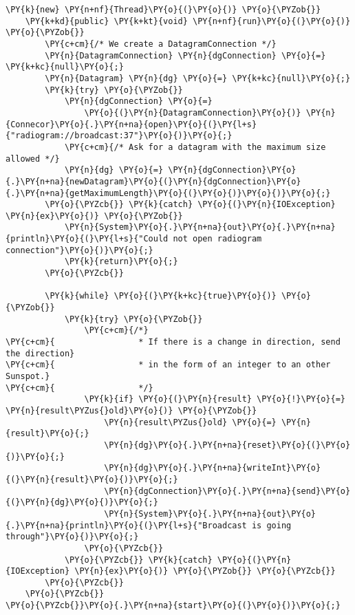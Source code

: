 \begin{Verbatim}[commandchars=\\\{\}]
\PY{k}{new} \PY{n+nf}{Thread}\PY{o}{(}\PY{o}{)} \PY{o}{\PYZob{}}
    \PY{k+kd}{public} \PY{k+kt}{void} \PY{n+nf}{run}\PY{o}{(}\PY{o}{)} \PY{o}{\PYZob{}}
        \PY{c+cm}{/* We create a DatagramConnection */}
        \PY{n}{DatagramConnection} \PY{n}{dgConnection} \PY{o}{=} \PY{k+kc}{null}\PY{o}{;}
        \PY{n}{Datagram} \PY{n}{dg} \PY{o}{=} \PY{k+kc}{null}\PY{o}{;}
        \PY{k}{try} \PY{o}{\PYZob{}}
            \PY{n}{dgConnection} \PY{o}{=}
                \PY{o}{(}\PY{n}{DatagramConnection}\PY{o}{)} \PY{n}{Connecor}\PY{o}{.}\PY{n+na}{open}\PY{o}{(}\PY{l+s}{"radiogram://broadcast:37"}\PY{o}{)}\PY{o}{;}
            \PY{c+cm}{/* Ask for a datagram with the maximum size allowed */}
            \PY{n}{dg} \PY{o}{=} \PY{n}{dgConnection}\PY{o}{.}\PY{n+na}{newDatagram}\PY{o}{(}\PY{n}{dgConnection}\PY{o}{.}\PY{n+na}{getMaximumLength}\PY{o}{(}\PY{o}{)}\PY{o}{)}\PY{o}{;}
        \PY{o}{\PYZcb{}} \PY{k}{catch} \PY{o}{(}\PY{n}{IOException} \PY{n}{ex}\PY{o}{)} \PY{o}{\PYZob{}}
            \PY{n}{System}\PY{o}{.}\PY{n+na}{out}\PY{o}{.}\PY{n+na}{println}\PY{o}{(}\PY{l+s}{"Could not open radiogram connection"}\PY{o}{)}\PY{o}{;}
            \PY{k}{return}\PY{o}{;}
        \PY{o}{\PYZcb{}}

        \PY{k}{while} \PY{o}{(}\PY{k+kc}{true}\PY{o}{)} \PY{o}{\PYZob{}}
            \PY{k}{try} \PY{o}{\PYZob{}}
                \PY{c+cm}{/*}
\PY{c+cm}{                 * If there is a change in direction, send the direction}
\PY{c+cm}{                 * in the form of an integer to an other Sunspot.}
\PY{c+cm}{                 */}
                \PY{k}{if} \PY{o}{(}\PY{n}{result} \PY{o}{!}\PY{o}{=} \PY{n}{result\PYZus{}old}\PY{o}{)} \PY{o}{\PYZob{}}
                    \PY{n}{result\PYZus{}old} \PY{o}{=} \PY{n}{result}\PY{o}{;}
                    \PY{n}{dg}\PY{o}{.}\PY{n+na}{reset}\PY{o}{(}\PY{o}{)}\PY{o}{;}
                    \PY{n}{dg}\PY{o}{.}\PY{n+na}{writeInt}\PY{o}{(}\PY{n}{result}\PY{o}{)}\PY{o}{;}
                    \PY{n}{dgConnection}\PY{o}{.}\PY{n+na}{send}\PY{o}{(}\PY{n}{dg}\PY{o}{)}\PY{o}{;}
                    \PY{n}{System}\PY{o}{.}\PY{n+na}{out}\PY{o}{.}\PY{n+na}{println}\PY{o}{(}\PY{l+s}{"Broadcast is going through"}\PY{o}{)}\PY{o}{;}
                \PY{o}{\PYZcb{}}
            \PY{o}{\PYZcb{}} \PY{k}{catch} \PY{o}{(}\PY{n}{IOException} \PY{n}{ex}\PY{o}{)} \PY{o}{\PYZob{}} \PY{o}{\PYZcb{}}
        \PY{o}{\PYZcb{}}
    \PY{o}{\PYZcb{}}
\PY{o}{\PYZcb{}}\PY{o}{.}\PY{n+na}{start}\PY{o}{(}\PY{o}{)}\PY{o}{;}
\end{Verbatim}
